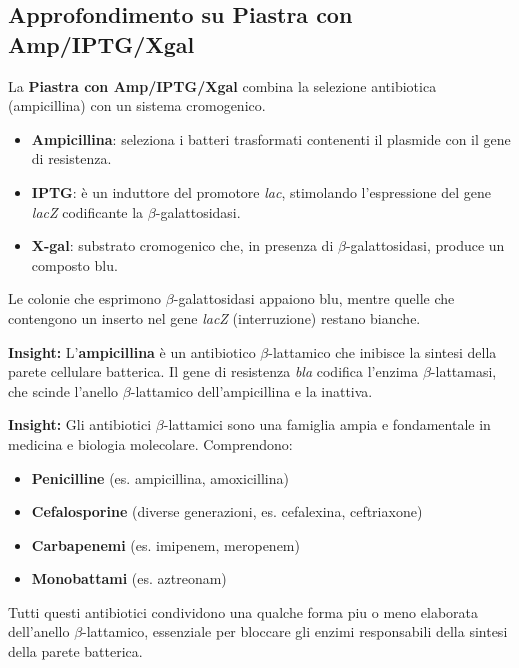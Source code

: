 \subsection{Approfondimento su Piastra con Amp/IPTG/Xgal}
La \textbf{Piastra con Amp/IPTG/Xgal} combina la selezione antibiotica (ampicillina) con un sistema cromogenico. 
\begin{itemize}\footnotesize
  \item \textbf{Ampicillina}: seleziona i batteri trasformati contenenti il plasmide con il gene di resistenza.
  \item \textbf{IPTG}: è un induttore del promotore \textit{lac}, stimolando l’espressione del gene \textit{lacZ} codificante la $\beta$-galattosidasi.
  \item \textbf{X-gal}: substrato cromogenico che, in presenza di $\beta$-galattosidasi, produce un composto blu.
\end{itemize}
Le colonie che esprimono $\beta$-galattosidasi appaiono blu, mentre quelle che contengono un inserto nel gene \textit{lacZ} (interruzione) restano bianche.


\begin{insightBox}
  \textbf{Insight:} L’\textbf{ampicillina} è un antibiotico $\beta$-lattamico che inibisce la sintesi della parete cellulare batterica. Il gene di resistenza \textit{bla} codifica l’enzima $\beta$-lattamasi, che scinde l’anello $\beta$-lattamico dell’ampicillina e la inattiva.
\end{insightBox}

\begin{insightBox}
  \textbf{Insight:} Gli antibiotici $\beta$-lattamici sono una famiglia ampia e fondamentale in medicina e biologia molecolare. 
  Comprendono: 
  \begin{itemize}\footnotesize
    \item \textbf{Penicilline} (es. ampicillina, amoxicillina)
    \item \textbf{Cefalosporine} (diverse generazioni, es. cefalexina, ceftriaxone)
    \item \textbf{Carbapenemi} (es. imipenem, meropenem)
    \item \textbf{Monobattami} (es. aztreonam)
  \end{itemize}
  Tutti questi antibiotici condividono una qualche forma piu o meno elaborata dell’anello $\beta$-lattamico, essenziale per bloccare gli enzimi responsabili della sintesi della parete batterica.
\end{insightBox}


